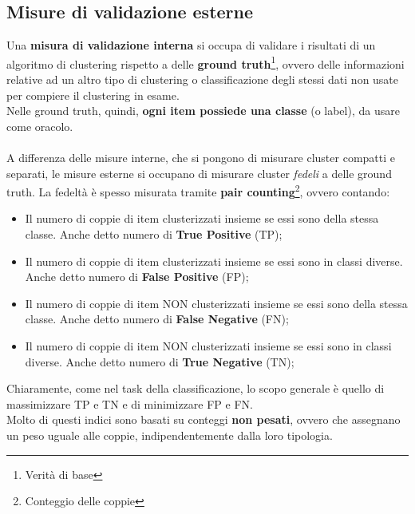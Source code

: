 \subsection{Misure di validazione esterne}
Una \textbf{misura di validazione interna} si occupa di validare i risultati di un algoritmo di clustering rispetto a delle \textbf{ground truth}\footnote{Verità di base}, ovvero delle informazioni relative ad un altro tipo di clustering o classificazione degli stessi dati non usate per compiere il clustering in esame.\\
Nelle ground truth, quindi, \textbf{ogni item possiede una classe} (o label), da usare come oracolo.\\
\\
A differenza delle misure interne, che si pongono di misurare cluster compatti e separati, le misure esterne si occupano di misurare cluster \textit{fedeli} a delle ground truth. La fedeltà è spesso misurata tramite \textbf{pair counting}\footnote{Conteggio delle coppie}, ovvero contando:
\begin{itemize}
	\item Il numero di coppie di item clusterizzati insieme se essi sono della stessa classe. Anche detto numero di \textbf{True Positive} (TP);
	\item Il numero di coppie di item clusterizzati insieme se essi sono in classi diverse. Anche detto numero di \textbf{False Positive} (FP);
	\item Il numero di coppie di item NON clusterizzati insieme se essi sono della stessa classe. Anche detto numero di \textbf{False Negative} (FN);
	\item Il numero di coppie di item NON clusterizzati insieme se essi sono in classi diverse. Anche detto numero di \textbf{True Negative} (TN);
\end{itemize}
Chiaramente, come nel task della classificazione, lo scopo generale è quello di massimizzare TP e TN e di minimizzare FP e FN.\\
Molto di questi indici sono basati su conteggi \textbf{non pesati}, ovvero che assegnano un peso uguale alle coppie, indipendentemente dalla loro tipologia.

